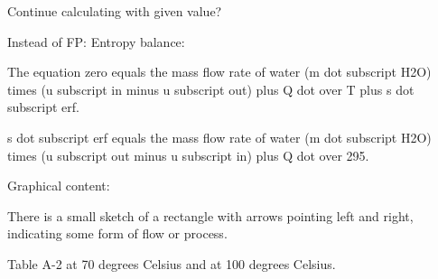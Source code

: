 Continue calculating with given value?

Instead of FP: Entropy balance:

The equation zero equals the mass flow rate of water (m dot subscript H2O) times (u subscript in minus u subscript out) plus Q dot over T plus s dot subscript erf.

s dot subscript erf equals the mass flow rate of water (m dot subscript H2O) times (u subscript out minus u subscript in) plus Q dot over 295.

Graphical content:

There is a small sketch of a rectangle with arrows pointing left and right, indicating some form of flow or process.

Table A-2 at 70 degrees Celsius and at 100 degrees Celsius.